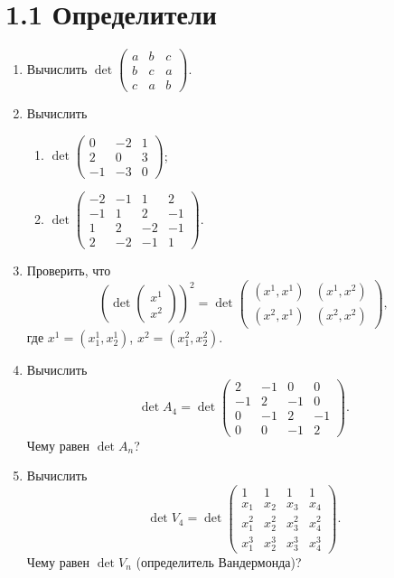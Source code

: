 % 
% 

	\section{1.1 Определители}
	\begin{enumerate}
		\item Вычислить $\det \begin{pmatrix}
			a & b & c \\
			b & c & a \\
			c & a & b
		\end{pmatrix}$.

		\item Вычислить 
		\begin{enumerate}
			\item $\det \begin{pmatrix}
				0 & -2 & 1 \\
				2 & 0 & 3 \\
				-1 & -3 & 0
			\end{pmatrix}$; 
			\item $\det \begin{pmatrix}
				-2 & -1 & 1 & 2 \\
				-1 & 1 & 2 & -1 \\
				1 & 2 & -2 & -1 \\
				2 & -2 & -1 & 1
			\end{pmatrix}$.
		\end{enumerate}
		\item Проверить, что 
		\[ 
			\left( \det \begin{pmatrix} x^1 \\ x^2 \end{pmatrix} \right)^2 = \det
			\begin{pmatrix}
				(x^1, x^1) & (x^1, x^2)\\
				(x^2, x^1) & (x^2, x^2) 
			\end{pmatrix},
		\]
		где $x^1 = (x^1_1, x^1_2)$, $x^2 = (x^2_1, x^2_2)$.

		\item Вычислить 
		\[ 
			\det A_4 = \det
			\begin{pmatrix}
				2 & -1 & 0 & 0 \\
				-1 & 2 & -1 & 0 \\
				0 & -1 & 2 & -1 \\
				0 & 0 & -1 & 2
			\end{pmatrix}.
		\]
		Чему равен $\det A_n$?

		\item Вычислить 
		\[ 
			\det V_4 = \det 
			\begin{pmatrix} 
				1 & 1 & 1 & 1 \\
				x_1 & x_2 & x_3 & x_4 \\
				x_1^2 & x_2^2 & x_3^2 & x_4^2 \\
				x_1^3 & x_2^3 & x_3^3 & x_4^3
			\end{pmatrix}.
		\]
		Чему равен $\det V_n$ (определитель Вандермонда)?


\end{enumerate}
